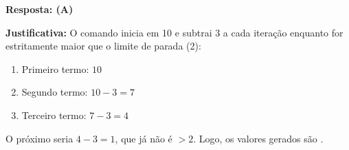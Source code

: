 \ifmostrarGabarito
\textbf{Resposta: (A)}

\textbf{Justificativa:}
O comando  inicia em 10 e subtrai 3 a cada iteração enquanto for estritamente maior que o limite de parada (2):
\begin{enumerate}
    \item Primeiro termo: $10$
    \item Segundo termo: $10 - 3 = 7$
    \item Terceiro termo: $7 - 3 = 4$
\end{enumerate}
O próximo seria $4 - 3 = 1$, que já não é $> 2$. Logo, os valores gerados são \code{[10, 7, 4]}.

\fi
